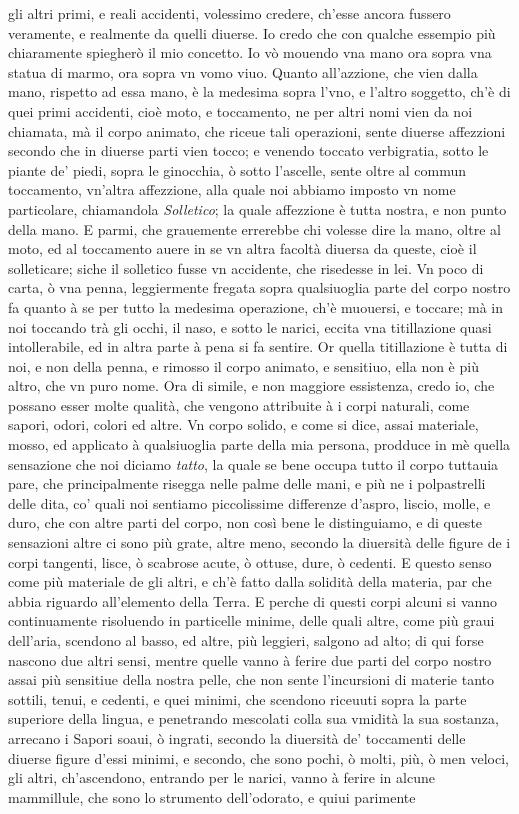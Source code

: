 \documentclass[11pt,twoside,openany]{book}
\begin{document}
gli altri primi, e reali accidenti, volessimo credere, ch'esse ancora fussero veramente, e realmente da quelli diuerse. Io credo che con qualche essempio più chiaramente spiegherò il mio concetto. Io vò mouendo vna mano ora sopra vna statua di marmo, ora sopra vn vomo viuo. Quanto all'azzione, che vien dalla mano, rispetto ad essa mano, è la medesima sopra l'vno, e l'altro soggetto, ch'è di quei primi accidenti, cioè moto, e toccamento, ne per altri nomi vien da noi chiamata, mà il corpo animato, che riceue tali operazioni, sente diuerse affezzioni secondo che in diuerse parti vien tocco; e venendo toccato verbigratia, sotto le piante de' piedi, sopra le ginocchia, ò sotto l'ascelle, sente oltre al commun toccamento, vn'altra affezzione, alla quale noi abbiamo imposto vn nome particolare, chiamandola \textit{Solletico}; la quale affezzione è tutta nostra, e non punto della mano. E parmi, che grauemente errerebbe chi volesse dire la mano, oltre al moto, ed al toccamento auere in se vn altra facoltà diuersa da queste, cioè il solleticare; siche il solletico fusse vn accidente, che risedesse in lei. Vn poco di carta, ò vna penna, leggiermente fregata sopra qualsiuoglia parte del corpo nostro fa quanto à se per tutto la medesima operazione, ch'è muouersi, e toccare; mà in noi toccando trà gli occhi, il naso, e sotto le narici, eccita vna titillazione quasi intollerabile, ed in altra parte à pena si fa sentire. Or quella titillazione è tutta di noi, e non della penna, e rimosso il corpo animato, e sensitiuo, ella non è più altro, che vn puro nome. Ora di simile, e non maggiore essistenza, credo io, che possano esser molte qualità, che vengono attribuite à i corpi naturali, come sapori, odori, colori ed altre. Vn corpo solido, e come si dice, assai materiale, mosso, ed applicato à qualsiuoglia parte della mia persona, prodduce in mè quella sensazione che noi diciamo \textit{tatto}, la quale se bene occupa tutto il corpo tuttauia pare, che principalmente risegga nelle palme delle mani, e più ne i polpastrelli delle dita, co' quali noi sentiamo piccolissime differenze d'aspro, liscio, molle, e duro, che con altre parti del corpo, non così bene le distinguiamo, e di queste sensazioni altre ci sono più grate, altre meno, secondo la diuersità delle figure de i corpi tangenti, lisce, ò scabrose acute, ò ottuse, dure, ò cedenti. E questo senso come più materiale de gli altri, e ch'è fatto dalla solidità della materia, par che abbia riguardo all'elemento della Terra. E perche di questi corpi alcuni si vanno continuamente risoluendo in particelle minime, delle quali altre, come più graui dell'aria, scendono al basso, ed altre, più leggieri, salgono ad alto; di qui forse nascono due altri sensi, mentre quelle vanno à ferire due parti del corpo nostro assai più sensitiue della nostra pelle, che non sente l'incursioni di materie tanto sottili, tenui, e cedenti, e quei minimi, che scendono riceuuti sopra la parte superiore della lingua, e penetrando mescolati colla sua vmidità la sua sostanza, arrecano i Sapori soaui, ò ingrati, secondo la diuersità de' toccamenti delle diuerse figure d'essi minimi, e secondo, che sono pochi, ò molti, più, ò men veloci, gli altri, ch'ascendono, entrando per le narici, vanno à ferire in alcune mammillule, che sono lo strumento dell'odorato, e quiui parimente 
\end{document}

